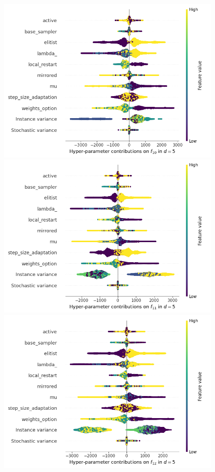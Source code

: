 \begin{figure}[t]
	\includegraphics[height=0.15\textheight,trim=60mm 0mm 30mm 0mm,clip]{cma_img_new/img_summary_f10_d5.png}
	\includegraphics[height=0.15\textheight,trim=60mm 0mm 30mm 0mm,clip]{cma_img_new/img_summary_f11_d5.png}
	\includegraphics[height=0.15\textheight,trim=60mm 0mm 0mm 0mm,clip]{cma_img_new/img_summary_f12_d5.png}

\end{figure}
